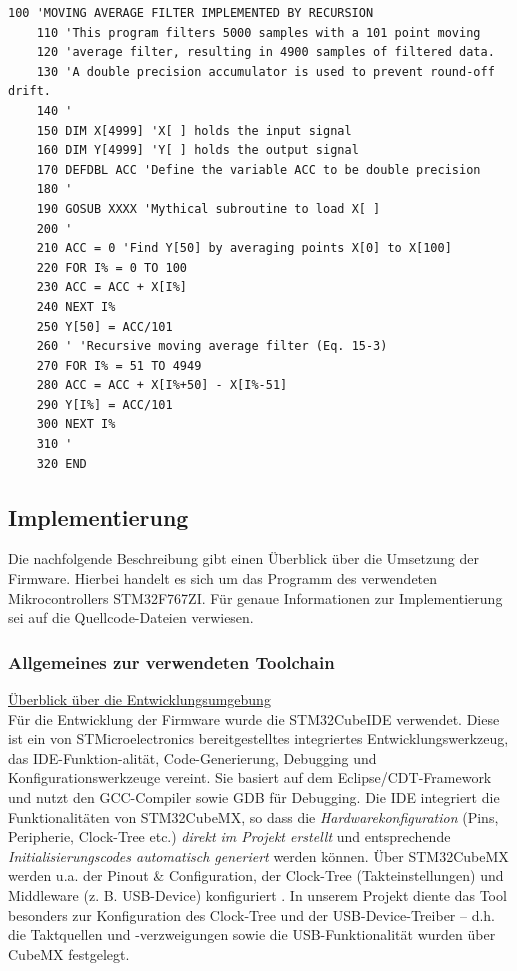 \documentclass[a4paper, portrait, 12pt]{scrartcl} %
\begin{document}
\begin{lstlisting}[style=plaintextstyle,caption={Pseudocode: Rekursiver Moving-Average-Filter aus \protect{\cite[S. 284]{Smith1999}}}, label={lst:moving_avg_filter_algorithm_recursive}]
	100 'MOVING AVERAGE FILTER IMPLEMENTED BY RECURSION
	110 'This program filters 5000 samples with a 101 point moving
	120 'average filter, resulting in 4900 samples of filtered data.
	130 'A double precision accumulator is used to prevent round-off drift.
	140 '
	150 DIM X[4999] 'X[ ] holds the input signal
	160 DIM Y[4999] 'Y[ ] holds the output signal
	170 DEFDBL ACC 'Define the variable ACC to be double precision
	180 '
	190 GOSUB XXXX 'Mythical subroutine to load X[ ]
	200 '
	210 ACC = 0 'Find Y[50] by averaging points X[0] to X[100]
	220 FOR I% = 0 TO 100
	230 ACC = ACC + X[I%]
	240 NEXT I%
	250 Y[50] = ACC/101
	260 ' 'Recursive moving average filter (Eq. 15-3)
	270 FOR I% = 51 TO 4949
	280 ACC = ACC + X[I%+50] - X[I%-51]
	290 Y[I%] = ACC/101
	300 NEXT I%
	310 '
	320 END
\end{lstlisting}
\pagebreak

\subsection{Implementierung}
Die nachfolgende Beschreibung gibt einen Überblick über die Umsetzung der Firmware. Hierbei handelt es sich um das Programm des verwendeten Mikrocontrollers STM32F767ZI. Für genaue Informationen zur Implementierung sei auf die Quellcode-Dateien verwiesen.

\subsubsection{Allgemeines zur verwendeten Toolchain}

\underline{Überblick über die Entwicklungsumgebung}\\
Für die Entwicklung der Firmware wurde die STM32CubeIDE verwendet.
Diese ist ein von STMicroelectronics bereitgestelltes integriertes Entwicklungswerkzeug, das IDE-Funktion-alität, Code-Generierung, Debugging und Konfigurationswerkzeuge vereint. Sie basiert auf dem Eclipse/CDT-Framework und nutzt den GCC-Compiler sowie GDB für Debugging. Die IDE integriert die Funktionalitäten von STM32CubeMX, so dass die \emph{Hardwarekonfiguration} (Pins, Peripherie, Clock-Tree etc.) \emph{direkt im Projekt erstellt} und entsprechende \emph{Initialisierungscodes automatisch generiert} werden können. Über STM32CubeMX werden u.a. der Pinout \& Configuration, der Clock-Tree (Takteinstellungen) und Middleware (z. B. USB-Device) konfiguriert \cite{STmicroelectronics2025a}. In unserem Projekt diente das Tool besonders zur Konfiguration des Clock-Tree und der USB-Device-Treiber – d.h. die Taktquellen und -verzweigungen sowie die USB-Funktionalität wurden über CubeMX festgelegt.
\end{document}
